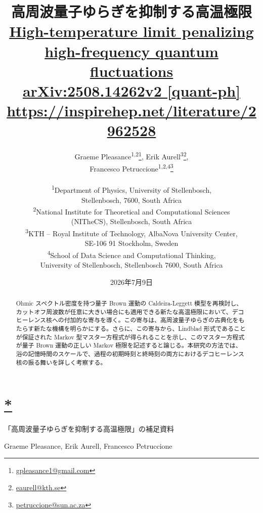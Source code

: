 \documentclass[a4paper,11pt]{ltjsarticle}
\title{\bfseries 高周波量子ゆらぎを抑制する高温極限\\[0.5em]
\large\href{https://journals.aps.org/prl/abstract/10.1103/kp9j-v4ss}{High-temperature limit penalizing high-frequency quantum fluctuations}\\[0.5em]
\normalsize\href{https://arxiv.org/abs/2508.14262v2}{arXiv:2508.14262v2 [quant-ph]}\\[0.35em]
\normalsize\url{https://inspirehep.net/literature/2962528}}
\author{%
Graeme Pleasance\textsuperscript{1,2}\thanks{\href{mailto:gpleasance1@gmail.com}{gpleasance1@gmail.com}},
Erik Aurell\textsuperscript{3}\thanks{\href{mailto:eaurell@kth.se}{eaurell@kth.se}},\\
Francesco Petruccione\textsuperscript{1,2,4}\thanks{\href{mailto:petruccione@sun.ac.za}{petruccione@sun.ac.za}}\\[0.6em]
\parbox{0.96\textwidth}{\centering\small
\textsuperscript{1}Department of Physics, University of Stellenbosch,\\
Stellenbosch, 7600, South Africa\\[0.25em]
\textsuperscript{2}National Institute for Theoretical and Computational Sciences\\
(NITheCS), Stellenbosch, South Africa\\[0.25em]
\textsuperscript{3}KTH -- Royal Institute of Technology, AlbaNova University Center,\\
SE-106 91 Stockholm, Sweden\\[0.25em]
\textsuperscript{4}School of Data Science and Computational Thinking,\\
University of Stellenbosch, Stellenbosch 7600, South Africa}}
\date{2026年7月9日}
\newcommand{\sectionlink}[1]{\section[#1]{\hyperlink{toc}{#1}}}
\numberwithin{equation}{section}
\begin{document}

\maketitle
\begin{abstract}
Ohmic スペクトル密度を持つ量子 Brown 運動の Caldeira-Leggett 模型を再検討し、カットオフ周波数が任意に大きい場合にも適用できる新たな高温極限において、デコヒーレンス核への付加的な寄与を導く。この寄与は、高周波量子ゆらぎの古典化をもたらす新たな機構を明らかにする。さらに、この寄与から、Lindblad 形式であることが保証された Markov 型マスター方程式が得られることを示し、このマスター方程式が量子 Brown 運動の正しい Markov 極限を記述すると論じる。本研究の方法では、浴の記憶時間のスケールで、過程の初期時刻と終時刻の両方におけるデコヒーレンス核の振る舞いを詳しく考察する。
\end{abstract}
\clearpage
\hypertarget{toc}{}
\tableofcontents
\clearpage

\clearpage
\renewcommand{\refname}{\hyperlink{toc}{参考文献}}


\clearpage
\sectionlink*{「高周波量子ゆらぎを抑制する高温極限」の補足資料}
\begin{center}
Graeme Pleasance, Erik Aurell, Francesco Petruccione
\end{center}


\end{document}
